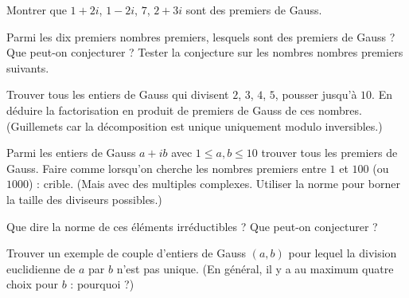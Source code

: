 \begin{exo}
Montrer que $1+2i$, $1-2i$, $7$, $2+3i$ sont des premiers de Gauss.
\end{exo}


\begin{exo}
Parmi les dix premiers nombres premiers, lesquels sont des premiers de Gauss ? Que peut-on conjecturer ? Tester la conjecture sur les nombres nombres premiers suivants.
\end{exo}

\begin{exo}
Trouver tous les entiers de Gauss qui divisent $2$, $3$, $4$, $5$, pousser jusqu'à $10$. En déduire \og la\fg{} factorisation en produit de premiers de Gauss de ces nombres. (Guillemets car la décomposition est unique uniquement modulo inversibles.)
\end{exo}

\begin{exo}
Parmi les entiers de Gauss $a+ib$ avec $1\leq a,b\leq 10$ trouver tous les premiers de Gauss. Faire comme lorsqu'on cherche les nombres premiers entre $1$ et $100$ (ou $1000$) : crible. (Mais avec des multiples complexes. Utiliser la norme pour borner la \og taille\fg{} des diviseurs possibles.)
\end{exo}

\begin{exo}
Que dire la norme de ces éléments irréductibles ? Que peut-on conjecturer ?
\end{exo}









\begin{exo}
Trouver un exemple de couple d'entiers de Gauss $(a,b)$ pour lequel la division euclidienne de $a$ par $b$ n'est pas unique. (En général, il y a au maximum quatre choix pour $b$ : pourquoi ?)
\end{exo}

